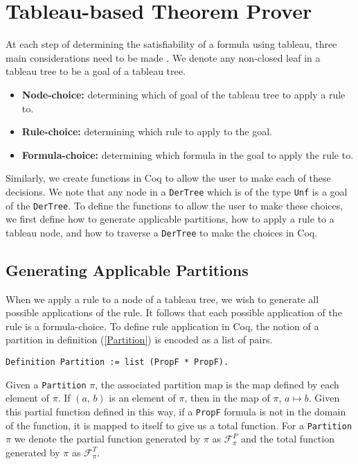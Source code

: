 \documentclass{llncs}
\begin{document}
\section{Tableau-based Theorem Prover}\label{Tableau-based Theorem Prover}
%
At each step of determining the satisfiability of a formula using tableau,
three main considerations need to be made \cite{abate2007tableau,
kelly2009revised}. We denote any non-closed leaf in a tableau tree to be a goal
of a tableau tree.
%
\begin{itemize}
\item \textbf{Node-choice:} determining which of goal of the tableau tree to
apply a rule to.
\item \textbf{Rule-choice:} determining which rule to apply to the goal.
\item \textbf{Formula-choice:} determining which formula in the goal to apply
the rule to.
\end{itemize}
%
Similarly, we create functions in Coq to allow the user to make each of these
decisions. We note that any node in a \verb+DerTree+ which is of the type
\verb+Unf+ is a goal of the \verb+DerTree+. To define the functions to allow
the user to make these choices, we first define how to generate applicable
partitions, how to apply a rule to a tableau node, and how to traverse a
\verb+DerTree+ to make the choices in Coq.
%
\subsection{Generating Applicable Partitions}
%
When we apply a rule to a node of a tableau tree, we wish to generate all
possible applications of the rule. It follows that each possible application of
the rule is a formula-choice. To define rule application in Coq, the notion of
a partition in definition (\ref{Partition}) is encoded as a list of pairs.
%
\begin{verbatim}
Definition Partition := list (PropF * PropF).
\end{verbatim}
%
Given a \verb+Partition+ $\pi$, the associated partition map is the map defined
by each element of $\pi$. If $(a, \, b)$ is an element of $\pi$, then in the
map of $\pi$, $a \mapsto b$. Given this partial function defined in this way,
if a \verb+PropF+ formula is not in the domain of the function, it is mapped to
itself to give us a total function. For a \verb+Partition+ $\pi$ we denote the 
partial function generated by $\pi$ as $\mathcal{F}^{P}_{\pi}$ and the total
function generated by $\pi$ as $\mathcal{F}^{T}_{\pi}$.
\end{document}
